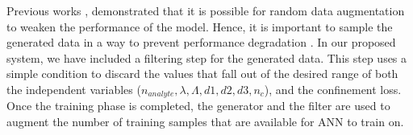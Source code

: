 \documentclass[journal]{IEEEtran}
\begin{document}
Previous works \cite{ravuri2019seeing, shmelkov2018good}, demonstrated that it is possible for random data augmentation to weaken the performance of the model. Hence, it is important to sample the generated data in a way to prevent performance degradation  \cite{bhattarai2019sampling}. In our proposed system, we have included a filtering step for the generated data. This step uses a simple condition to discard the values that fall out of the desired range of both the independent variables  ($n_{analyte}, \lambda, \Lambda, d1, d2, d3, n_c$), and the confinement loss. Once the training phase is completed, the generator and the filter are used to augment the number of training samples that are available for ANN to train on.
%
%	
\end{document}
